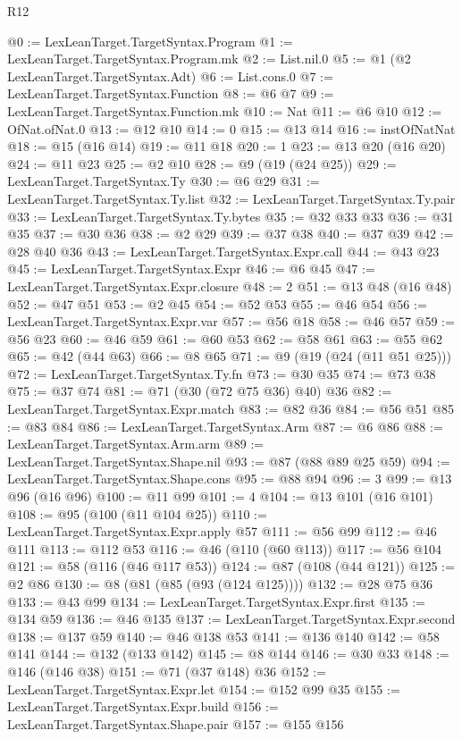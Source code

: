 \begin{lexlean}{R12}
\begin{coremodule}
@0 := LexLeanTarget.TargetSyntax.Program
@1 := LexLeanTarget.TargetSyntax.Program.mk
@2 := List.nil.{0}
@5 := @1 (@2 LexLeanTarget.TargetSyntax.Adt)
@6 := List.cons.{0}
@7 := LexLeanTarget.TargetSyntax.Function
@8 := @6 @7
@9 := LexLeanTarget.TargetSyntax.Function.mk
@10 := Nat
@11 := @6 @10
@12 := OfNat.ofNat.{0}
@13 := @12 @10
@14 := 0
@15 := @13 @14
@16 := instOfNatNat
@18 := @15 (@16 @14)
@19 := @11 @18
@20 := 1
@23 := @13 @20 (@16 @20)
@24 := @11 @23
@25 := @2 @10
@28 := @9 (@19 (@24 @25))
@29 := LexLeanTarget.TargetSyntax.Ty
@30 := @6 @29
@31 := LexLeanTarget.TargetSyntax.Ty.list
@32 := LexLeanTarget.TargetSyntax.Ty.pair
@33 := LexLeanTarget.TargetSyntax.Ty.bytes
@35 := @32 @33 @33
@36 := @31 @35
@37 := @30 @36
@38 := @2 @29
@39 := @37 @38
@40 := @37 @39
@42 := @28 @40 @36
@43 := LexLeanTarget.TargetSyntax.Expr.call
@44 := @43 @23
@45 := LexLeanTarget.TargetSyntax.Expr
@46 := @6 @45
@47 := LexLeanTarget.TargetSyntax.Expr.closure
@48 := 2
@51 := @13 @48 (@16 @48)
@52 := @47 @51
@53 := @2 @45
@54 := @52 @53
@55 := @46 @54
@56 := LexLeanTarget.TargetSyntax.Expr.var
@57 := @56 @18
@58 := @46 @57
@59 := @56 @23
@60 := @46 @59
@61 := @60 @53
@62 := @58 @61
@63 := @55 @62
@65 := @42 (@44 @63)
@66 := @8 @65
@71 := @9 (@19 (@24 (@11 @51 @25)))
@72 := LexLeanTarget.TargetSyntax.Ty.fn
@73 := @30 @35
@74 := @73 @38
@75 := @37 @74
@81 := @71 (@30 (@72 @75 @36) @40) @36
@82 := LexLeanTarget.TargetSyntax.Expr.match
@83 := @82 @36
@84 := @56 @51
@85 := @83 @84
@86 := LexLeanTarget.TargetSyntax.Arm
@87 := @6 @86
@88 := LexLeanTarget.TargetSyntax.Arm.arm
@89 := LexLeanTarget.TargetSyntax.Shape.nil
@93 := @87 (@88 @89 @25 @59)
@94 := LexLeanTarget.TargetSyntax.Shape.cons
@95 := @88 @94
@96 := 3
@99 := @13 @96 (@16 @96)
@100 := @11 @99
@101 := 4
@104 := @13 @101 (@16 @101)
@108 := @95 (@100 (@11 @104 @25))
@110 := LexLeanTarget.TargetSyntax.Expr.apply @57
@111 := @56 @99
@112 := @46 @111
@113 := @112 @53
@116 := @46 (@110 (@60 @113))
@117 := @56 @104
@121 := @58 (@116 (@46 @117 @53))
@124 := @87 (@108 (@44 @121))
@125 := @2 @86
@130 := @8 (@81 (@85 (@93 (@124 @125))))
@132 := @28 @75 @36
@133 := @43 @99
@134 := LexLeanTarget.TargetSyntax.Expr.first
@135 := @134 @59
@136 := @46 @135
@137 := LexLeanTarget.TargetSyntax.Expr.second
@138 := @137 @59
@140 := @46 @138 @53
@141 := @136 @140
@142 := @58 @141
@144 := @132 (@133 @142)
@145 := @8 @144
@146 := @30 @33
@148 := @146 (@146 @38)
@151 := @71 (@37 @148) @36
@152 := LexLeanTarget.TargetSyntax.Expr.let
@154 := @152 @99 @35
@155 := LexLeanTarget.TargetSyntax.Expr.build
@156 := LexLeanTarget.TargetSyntax.Shape.pair
@157 := @155 @156

\end{coremodule}
\end{lexlean}

